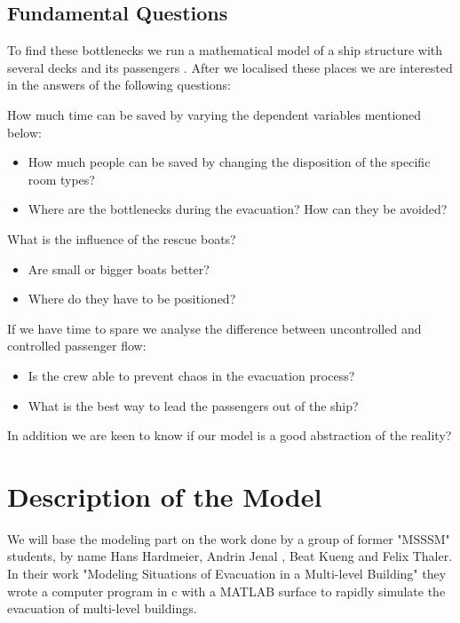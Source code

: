 \documentclass[11pt]{article}
\begin{document}
\subsection{Fundamental Questions}
To find these bottlenecks we run a mathematical model of a ship structure  with several decks and its passengers \cite{shipdecks}. After we localised these places we are interested in the answers of the following questions:

\bigskip
How much time can be saved by varying the dependent variables mentioned below:
\begin{itemize}
\item How much people can be saved by changing the disposition of the specific room types?
\item Where are the bottlenecks during the evacuation? How can they be avoided?
\end{itemize}

What is the influence of the rescue boats?
\begin{itemize}
\item Are small or bigger boats better?
\item Where do they have to be positioned?
\end{itemize}
If we have time to spare we analyse the difference between uncontrolled and controlled passenger flow:
\begin{itemize}
\item Is the crew able to prevent chaos in the evacuation process?
\item What is the best way to lead the passengers out of the ship?
\end{itemize}
In addition we are keen to know if our model is a good abstraction of the reality?
\section{Description of the Model}
We will base the modeling part on the work done by a group of former "MSSSM" students, by name Hans Hardmeier, Andrin Jenal , Beat Kueng and Felix Thaler. \cite{Building} In their work "Modeling Situations of Evacuation in a Multi-level Building" they wrote a computer program in c with a MATLAB surface to rapidly simulate the evacuation of multi-level buildings.\bigskip
\end{document}
